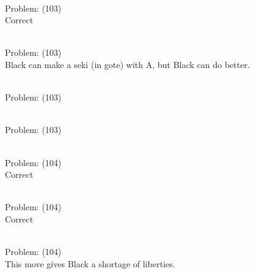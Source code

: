 \documentclass[11pt]{article}
\begin{document}
\begin{minipage}[t]{0.5\textwidth}
  {\centering
  
\\
Problem: (103)\\
Correct\\
  }
\end{minipage}
\begin{minipage}[t]{0.5\textwidth}
  {\centering
  
\\
Problem: (103)\\
Black can make a seki (in gote) with A, but Black can do better.\\
  }
\end{minipage}
\begin{minipage}[t]{0.5\textwidth}
  {\centering
  
\\
Problem: (103)\\
  }
\end{minipage}
\begin{minipage}[t]{0.5\textwidth}
  {\centering
  
\\
Problem: (103)\\
  }
\end{minipage}
\begin{minipage}[t]{0.5\textwidth}
  {\centering
  
\\
Problem: (104)\\
Correct\\
  }
\end{minipage}
\begin{minipage}[t]{0.5\textwidth}
  {\centering
  
\\
Problem: (104)\\
Correct\\
  }
\end{minipage}
\begin{minipage}[t]{0.5\textwidth}
  {\centering
  
\\
Problem: (104)\\
This move gives Black a shortage of liberties.\\
  }
\end{minipage}
\end{document}

